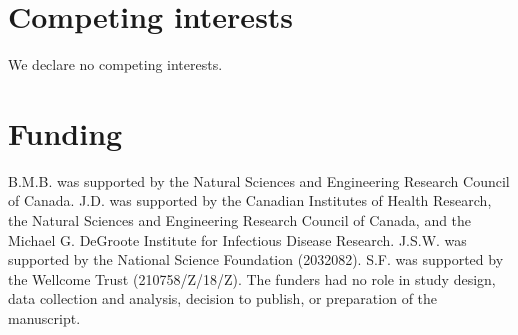 \documentclass[12pt]{article}
\begin{document}
\section*{Competing interests}

We declare no competing interests.

\section*{Funding}

B.M.B. was supported by the Natural Sciences and Engineering Research Council of Canada. 
J.D. was supported by the Canadian Institutes of Health Research, 
the Natural Sciences and Engineering Research Council of Canada, 
and the Michael G. DeGroote Institute for Infectious Disease Research.
J.S.W. was supported by the National Science Foundation (2032082).
S.F. was supported by the Wellcome Trust (210758/Z/18/Z).
The funders had no role in study design, data collection and analysis, decision to publish, or preparation of the manuscript.

\pagebreak


\end{document}
